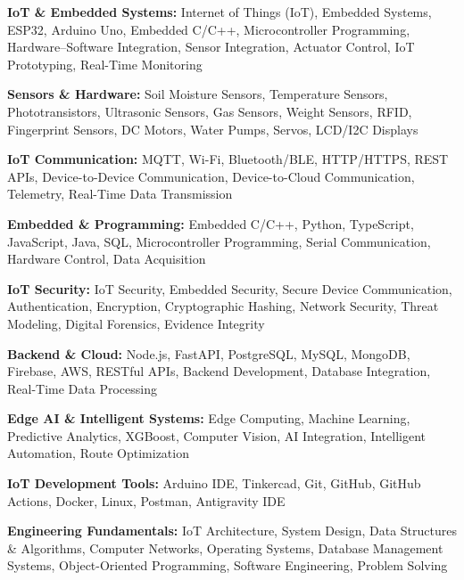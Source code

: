 \documentclass[a4paper,11pt]{article}
\begin{document}
\begin{itemize}[leftmargin=0in, label={}]

\small{

\item{
\textbf{IoT \& Embedded Systems:} Internet of Things (IoT), Embedded Systems, ESP32, Arduino Uno, Embedded C/C++, Microcontroller Programming, Hardware--Software Integration, Sensor Integration, Actuator Control, IoT Prototyping, Real-Time Monitoring
}

\item{
\textbf{Sensors \& Hardware:} Soil Moisture Sensors, Temperature Sensors, Phototransistors, Ultrasonic Sensors, Gas Sensors, Weight Sensors, RFID, Fingerprint Sensors, DC Motors, Water Pumps, Servos, LCD/I2C Displays
}

\item{
\textbf{IoT Communication:} MQTT, Wi-Fi, Bluetooth/BLE, HTTP/HTTPS, REST APIs, Device-to-Device Communication, Device-to-Cloud Communication, Telemetry, Real-Time Data Transmission
}

\item{
\textbf{Embedded \& Programming:} Embedded C/C++, Python, TypeScript, JavaScript, Java, SQL, Microcontroller Programming, Serial Communication, Hardware Control, Data Acquisition
}

\item{
\textbf{IoT Security:} IoT Security, Embedded Security, Secure Device Communication, Authentication, Encryption, Cryptographic Hashing, Network Security, Threat Modeling, Digital Forensics, Evidence Integrity
}

\item{
\textbf{Backend \& Cloud:} Node.js, FastAPI, PostgreSQL, MySQL, MongoDB, Firebase, AWS, RESTful APIs, Backend Development, Database Integration, Real-Time Data Processing
}

\item{
\textbf{Edge AI \& Intelligent Systems:} Edge Computing, Machine Learning, Predictive Analytics, XGBoost, Computer Vision, AI Integration, Intelligent Automation, Route Optimization
}

\item{
\textbf{IoT Development Tools:} Arduino IDE, Tinkercad, Git, GitHub, GitHub Actions, Docker, Linux, Postman, Antigravity IDE
}

\item{
\textbf{Engineering Fundamentals:} IoT Architecture, System Design, Data Structures \& Algorithms, Computer Networks, Operating Systems, Database Management Systems, Object-Oriented Programming, Software Engineering, Problem Solving
}

}

\end{itemize}
\end{document}
